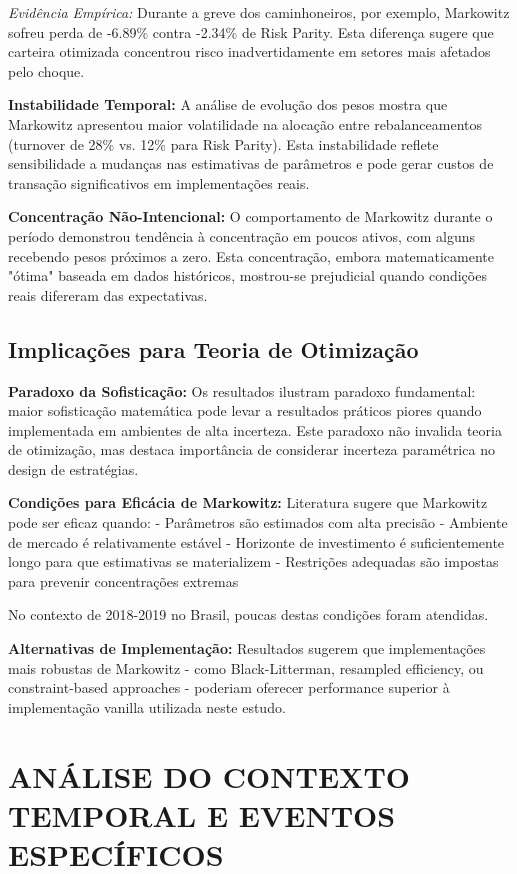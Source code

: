 \textit{Evidência Empírica:} Durante a greve dos caminhoneiros, por exemplo, Markowitz sofreu perda de -6.89\% contra -2.34\% de Risk Parity. Esta diferença sugere que carteira otimizada concentrou risco inadvertidamente em setores mais afetados pelo choque.

\textbf{Instabilidade Temporal:} A análise de evolução dos pesos mostra que Markowitz apresentou maior volatilidade na alocação entre rebalanceamentos (turnover de 28\% vs. 12\% para Risk Parity). Esta instabilidade reflete sensibilidade a mudanças nas estimativas de parâmetros e pode gerar custos de transação significativos em implementações reais.

\textbf{Concentração Não-Intencional:} O comportamento de Markowitz durante o período demonstrou tendência à concentração em poucos ativos, com alguns recebendo pesos próximos a zero. Esta concentração, embora matematicamente "ótima" baseada em dados históricos, mostrou-se prejudicial quando condições reais difereram das expectativas.

\subsection{Implicações para Teoria de Otimização}

\textbf{Paradoxo da Sofisticação:} Os resultados ilustram paradoxo fundamental: maior sofisticação matemática pode levar a resultados práticos piores quando implementada em ambientes de alta incerteza. Este paradoxo não invalida teoria de otimização, mas destaca importância de considerar incerteza paramétrica no design de estratégias.

\textbf{Condições para Eficácia de Markowitz:} Literatura sugere que Markowitz pode ser eficaz quando:
- Parâmetros são estimados com alta precisão
- Ambiente de mercado é relativamente estável
- Horizonte de investimento é suficientemente longo para que estimativas se materializem
- Restrições adequadas são impostas para prevenir concentrações extremas

No contexto de 2018-2019 no Brasil, poucas destas condições foram atendidas.

\textbf{Alternativas de Implementação:} Resultados sugerem que implementações mais robustas de Markowitz - como Black-Litterman, resampled efficiency, ou constraint-based approaches - poderiam oferecer performance superior à implementação vanilla utilizada neste estudo.

\section{ANÁLISE DO CONTEXTO TEMPORAL E EVENTOS ESPECÍFICOS}

